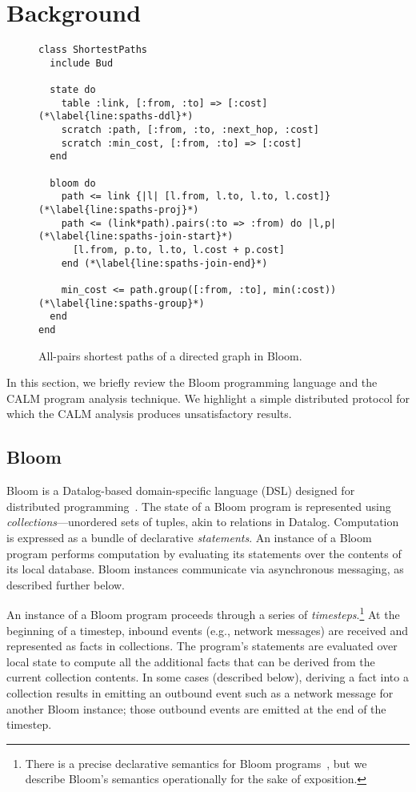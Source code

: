 \section{Background}
\label{sec:background}

\begin{figure}[t]
\begin{scriptsize}
\begin{lstlisting}
class ShortestPaths
  include Bud

  state do
    table :link, [:from, :to] => [:cost] (*\label{line:spaths-ddl}*)
    scratch :path, [:from, :to, :next_hop, :cost]
    scratch :min_cost, [:from, :to] => [:cost]
  end

  bloom do
    path <= link {|l| [l.from, l.to, l.to, l.cost]} (*\label{line:spaths-proj}*)
    path <= (link*path).pairs(:to => :from) do |l,p| (*\label{line:spaths-join-start}*)
      [l.from, p.to, l.to, l.cost + p.cost]
    end (*\label{line:spaths-join-end}*)

    min_cost <= path.group([:from, :to], min(:cost)) (*\label{line:spaths-group}*)
  end
end
\end{lstlisting}
\end{scriptsize}
\caption{All-pairs shortest paths of a directed graph in Bloom.}
\label{fig:bloom-spaths}
\end{figure}

In this section, we briefly review the Bloom programming language and the CALM
program analysis technique.  We highlight a simple distributed protocol for
which the CALM analysis produces unsatisfactory results.

\subsection{Bloom}
\label{sec:bg-bloom}

Bloom is a Datalog-based domain-specific language (DSL) designed for distributed
programming~\cite{Alvaro2011,bloom}. The state of a Bloom program is represented
using \emph{collections}---unordered sets of tuples, akin to relations in
Datalog. Computation is expressed as a bundle of declarative \emph{statements}.
An instance of a Bloom program performs computation by evaluating its statements
over the contents of its local database. Bloom instances communicate via
asynchronous messaging, as described further below.

An instance of a Bloom program proceeds through a series of
\emph{timesteps}.\footnote{There is a precise declarative semantics for Bloom
  programs~\cite{dedalus}, but we describe Bloom's semantics operationally for
  the sake of exposition.} At the beginning of a timestep, inbound events (e.g.,
network messages) are received and represented as facts in collections. The
program's statements are evaluated over local state to compute all the
additional facts that can be derived from the current collection contents. In
some cases (described below), deriving a fact into a collection results in
emitting an outbound event such as a network message for another Bloom instance;
those outbound events are emitted at the end of the timestep.

